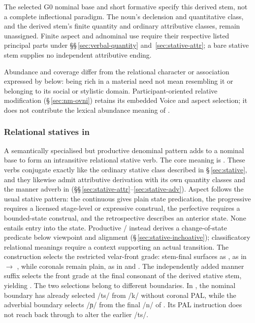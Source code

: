 The selected G0 nominal base and short formative specify this derived stem,
not a complete inflectional paradigm. The noun's declension and quantitative
class, and the derived stem's finite quantity and ordinary attributive
classes, remain unassigned. Finite aspect and adnominal use require their
respective listed principal parts under §§\,\ref{sec:verbal-quantity}
and~\ref{sec:stative-attr}; a bare stative stem supplies no independent
attributive ending.

Abundance and coverage differ from the relational character or association
expressed by  below: being rich in a material need not mean
resembling it or belonging to its social or stylistic domain.
Participant-oriented relative modification (§\,\ref{sec:nm-ovni}) retains
its embedded Voice and aspect selection; it does not contribute the lexical
abundance meaning of .

\subsubsection{Relational statives in }

A semantically specialised but productive denominal pattern adds
 to a nominal base to form an intransitive relational stative
verb. The core meaning is . These verbs
conjugate exactly like the ordinary stative class described in
§\,\ref{sec:stative}, and they likewise admit attributive derivation with
its own quantity classes and the manner adverb in 
(§§\,\ref{sec:stative-attr}--\ref{sec:stative-adv}). Aspect follows the
usual stative pattern: the continuous gives plain state predication, the
progressive requires a licensed stage-level or expressive construal, the
perfective requires a bounded-state construal, and the retrospective describes
an anterior state. None entails entry into the state. Productive
/ instead derives a change-of-state predicate below
viewpoint and alignment (§\,\ref{sec:stative-inchoative}); classificatory
relational meanings require a context supporting an actual transition. The construction selects the restricted
velar-front grade: stem-final  surfaces as , as in
 $\rightarrow$ , while coronals remain plain,
as in  and . The independently added manner
suffix  selects the front grade at the final consonant of the
derived stative stem, yielding . The two selections belong to
different boundaries. In , the nominal boundary has already
selected /ts/ from /k/ without coronal PAL, while the adverbial boundary
selects /ɲ/ from the final /n/ of . Its PAL instruction
does not reach back through  to alter the earlier /ts/.

